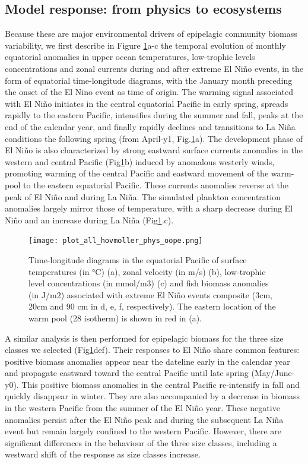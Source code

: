\subsection{Model response: from physics to ecosystems}

Because these are major environmental drivers of epipelagic community biomass variability, we first describe in Figure \ref{fig:hov_nemo_ape}a-c the temporal evolution of monthly equatorial anomalies in upper ocean temperatures, low-trophic levels concentrations and zonal currents during and after extreme El Niño events, in the form of equatorial time-longitude diagrams, with the January month preceding the onset of the El Nino event as time of origin. The warming signal associated with El Niño initiates in the central equatorial Pacific in early spring, spreads rapidly to the eastern Pacific, intensifies during the summer and fall, peaks at the end of the calendar year, and finally rapidly declines and transitions to La Niña conditions the following spring (from April-y1, Fig.\ref{fig:hov_nemo_ape}a). The development phase of El Niño is also characterized by strong  eastward surface currents anomalies in the western and central Pacific (Fig\ref{fig:hov_nemo_ape}b) induced by anomalous westerly winds, promoting warming of the central Pacific and eastward movement of the warm-pool to the eastern equatorial Pacific. These currents anomalies reverse at the peak of El Niño and during La Niña. The simulated plankton concentration anomalies largely mirror those of temperature, with a sharp decrease during El Niño and an increase during La Niña (Fig\ref{fig:hov_nemo_ape}.c). 

\begin{figure}[h!tp]
	\centering
	\texttt{[image: plot\_all\_hovmoller\_phys\_oope.png]}	
	\caption{Time-longitude diagrams in the equatorial Pacific of surface temperatures (in °C) (a), zonal velocity (in m/s) (b), low-trophic level concentrations (in mmol/m3) (c) and fish biomass anomalies (in J/m2) associated with extreme El Niño events composite (3cm, 20cm and 90 cm in d, e, f, respectively). The eastern location of the warm pool (28\degree{} isotherm) is shown in red in (a).}	
	\label{fig:hov_nemo_ape}
\end{figure}

A similar analysis is then performed for epipelagic biomass for the three size classes we selected (Fig\ref{fig:hov_nemo_ape}def). Their responses to El Niño share common features: positive biomass anomalies appear near the dateline early in the calendar year and propagate eastward toward the central Pacific until late spring (May/June-y0). This positive biomass anomalies in the central Pacific re-intensify in fall and quickly disappear in winter. They are also accompanied by a decrease in biomass in the western Pacific from the summer of the El Niño year. These negative anomalies persist after the El Niño peak and during the subsequent La Niña event but remain largely confined to the western Pacific. However, there are significant differences in the behaviour of the three size classes, including a westward shift of the response as size classes increase.


